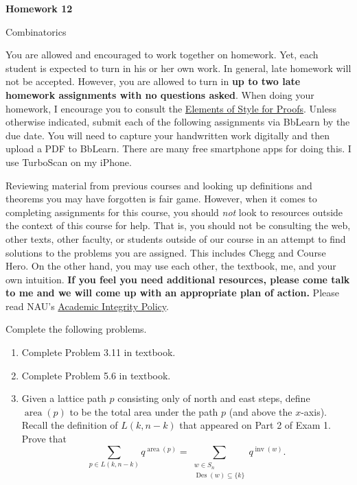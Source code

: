 \documentclass[11pt]{article}%
\theoremstyle{definition}
\DeclareMathOperator{\Des}{Des}
\DeclareMathOperator{\inv}{inv}
\DeclareMathOperator{\area}{area}
\newcommand{\blankline}{\pagebreak[2]\vspace{.5\baselineskip}}
\begin{document}
\begin{center}
{\Large\bf Homework 12}

\smallskip

Combinatorics
\end{center}

\thispagestyle{fancy}

You are allowed and encouraged to work together on homework. Yet, each student is expected to turn in his or her own work. In general, late homework will not be accepted. However, you are allowed to turn in \textbf{up to two late homework assignments with no questions asked}. When doing your homework, I encourage you to consult the \href{http://danaernst.com/teaching/ElementsOfStyle.pdf}{Elements of Style for Proofs}. Unless otherwise indicated, submit each of the following assignments via BbLearn by the due date. You will need to capture your handwritten work digitally and then upload a PDF to BbLearn. There are many free smartphone apps for doing this. I use TurboScan on my iPhone.

\blankline

Reviewing material from previous courses and looking up definitions and theorems you may have forgotten is fair game. However, when it comes to completing assignments for this course, you should \emph{not} look to resources outside the context of this course for help.  That is, you should not be consulting the web, other texts, other faculty, or students outside of our course in an attempt to find solutions to the problems you are assigned.  This includes Chegg and Course Hero. On the other hand, you may use each other, the textbook, me, and your own intuition. \textbf{If you feel you need additional resources, please come talk to me and we will come up with an appropriate plan of action.} Please read NAU's \href{https://www5.nau.edu/policies/Client/Details/828?whoIsLooking=Students&pertainsTo=All&sortDirection=Ascending&page=1}{Academic Integrity Policy}.

\blankline

Complete the following problems. 
\begin{enumerate}
\item Complete Problem 3.11 in textbook.
\item Complete Problem 5.6 in textbook.
\item Given a lattice path $p$ consisting only of north and east steps, define $\area(p)$ to be the total area under the path $p$ (and above the $x$-axis). Recall the definition of $L(k,n-k)$ that appeared on Part 2 of Exam 1. Prove that
\[
\sum_{p\in L(k,n-k)}q^{\area(p)}=\sum_{\substack{w\in S_n \\ \Des(w)\subseteq \{k\}}} q^{\inv(w)}.
\]
\end{enumerate}
\end{document}

